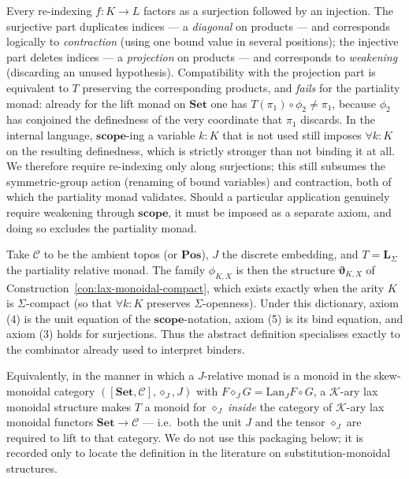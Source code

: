 \begin{remark}
\label{rem:weakening}
Every re-indexing $f\colon K\to L$ factors as a surjection followed by an
injection. The surjective part duplicates indices --- a \emph{diagonal} on
products --- and corresponds logically to \emph{contraction} (using one bound
value in several positions); the injective part deletes indices --- a
\emph{projection} on products --- and corresponds to \emph{weakening}
(discarding an unused hypothesis). Compatibility with the projection part is
equivalent to $T$ preserving the corresponding products, and \emph{fails} for
the partiality monad: already for the lift monad on $\mathbf{Set}$ one has
$T(\pi_1)\circ\phi_{2}\neq\pi_1$, because $\phi_2$ has conjoined the definedness
of the very coordinate that $\pi_1$ discards. In the internal language,
$\mathbf{scope}$-ing a variable $k\colon K$ that is not used still imposes
$\forall k\colon K$ on the resulting definedness, which is strictly stronger
than not binding it at all. We therefore require re-indexing only along
surjections; this still subsumes the symmetric-group action (renaming of bound
variables) and contraction, both of which the partiality monad validates.
Should a particular application genuinely require weakening through
$\mathbf{scope}$, it must be imposed as a separate axiom, and doing so excludes
the partiality monad.
\end{remark}

\begin{remark}
Take $\mathcal{C}$ to be the ambient topos (or $\mathbf{Pos}$), $J$ the discrete
embedding, and $T=\mathbf{L}_\Sigma$ the partiality relative monad. The family
$\phi_{K,X}$ is then the structure $\boldsymbol{\vartheta}_{K,X}$ of
Construction~\ref{con:lax-monoidal-compact}, which exists exactly when the arity
$K$ is $\Sigma$-compact (so that $\forall k\colon K$ preserves
$\Sigma$-openness). Under this dictionary, axiom (4) is the unit equation of the
$\mathbf{scope}$-notation, axiom (5) is its bind equation, and axiom (3) holds
for surjections. Thus the abstract definition specialises exactly to the
combinator already used to interpret binders.
\end{remark}

\begin{remark}
Equivalently, in the manner in which a $J$-relative monad is a monoid in the
skew-monoidal category $([\mathbf{Set},\mathcal{C}],\diamond_J,J)$ with
$F\diamond_J G=\mathrm{Lan}_J F\circ G$, a $\mathcal{K}$-ary lax monoidal
structure makes $T$ a monoid for $\diamond_J$ \emph{inside} the category of
$\mathcal{K}$-ary lax monoidal functors $\mathbf{Set}\to\mathcal{C}$ --- i.e.\
both the unit $J$ and the tensor $\diamond_J$ are required to lift to that
category. We do not use this packaging below; it is recorded only to locate the
definition in the literature on substitution-monoidal structures.
\end{remark}
